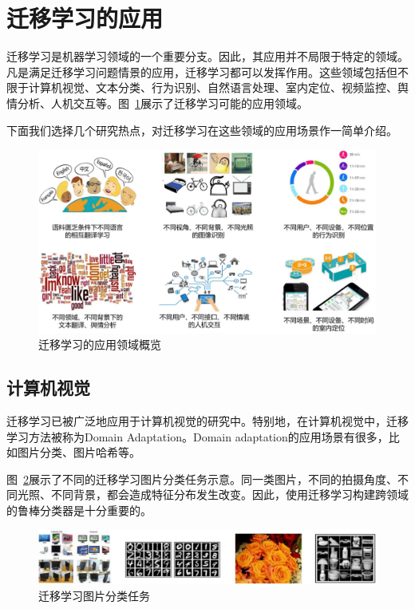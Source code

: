 \newpage

\section{迁移学习的应用}

迁移学习是机器学习领域的一个重要分支。因此，其应用并不局限于特定的领域。凡是满足迁移学习问题情景的应用，迁移学习都可以发挥作用。这些领域包括但不限于计算机视觉、文本分类、行为识别、自然语言处理、室内定位、视频监控、舆情分析、人机交互等。图~\ref{fig-app-all}展示了迁移学习可能的应用领域。

下面我们选择几个研究热点，对迁移学习在这些领域的应用场景作一简单介绍。

\begin{figure}[htbp]
	\centering
	\includegraphics[scale=0.42]{./figures/fig-app-all.pdf}
	\caption{迁移学习的应用领域概览}
	\label{fig-app-all}
\end{figure}

\subsection{计算机视觉}

迁移学习已被广泛地应用于计算机视觉的研究中。特别地，在计算机视觉中，迁移学习方法被称为Domain Adaptation。Domain adaptation的应用场景有很多，比如图片分类、图片哈希等。

图~\ref{fig-app-cv}展示了不同的迁移学习图片分类任务示意。同一类图片，不同的拍摄角度、不同光照、不同背景，都会造成特征分布发生改变。因此，使用迁移学习构建跨领域的鲁棒分类器是十分重要的。

\begin{figure}[htbp]
	\centering
	\includegraphics[scale=0.42]{./figures/fig-app-cv.pdf}
	\caption{迁移学习图片分类任务}
	\label{fig-app-cv}
\end{figure}

